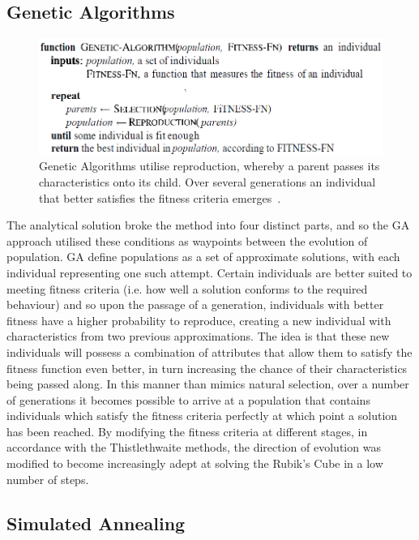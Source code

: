 \documentclass[UKenglish]{svproc}
\begin{document}
\subsection{Genetic Algorithms}

\begin{figure}[!h]
\begin{small}
\centering
\linespread{1.0}
\includegraphics[width=0.75\linewidth]{images/genetic algorithm}
\caption{Genetic Algorithms utilise reproduction, whereby a parent passes its characteristics onto its child. Over several generations an individual that better satisfies the fitness criteria emerges~\cite{10.5555/1671238}.}
\label{fig:fig0}
\end{small}
\end{figure}

The analytical solution broke the method into four distinct parts, and so the GA approach utilised these conditions as waypoints between the evolution of population. GA define populations as a set of approximate solutions, with each individual representing one such attempt. Certain individuals are better suited to meeting fitness criteria (i.e. how well a solution conforms to the required behaviour) and so upon the passage of a generation, individuals with better fitness have a higher probability to reproduce, creating a new individual with characteristics from two previous approximations. The idea is that these new individuals will possess a combination of attributes that allow them to satisfy the fitness function even better, in turn increasing the chance of their characteristics being passed along. In this manner than mimics natural selection, over a number of generations it becomes possible to arrive at a population that contains individuals which satisfy the fitness criteria perfectly at which point a solution has been reached. By modifying the fitness criteria at different stages, in accordance with the Thistlethwaite methods, the direction of evolution was modified to become increasingly adept at solving the Rubik's Cube in a low number of steps.

\subsection{Simulated Annealing}
\end{document}
